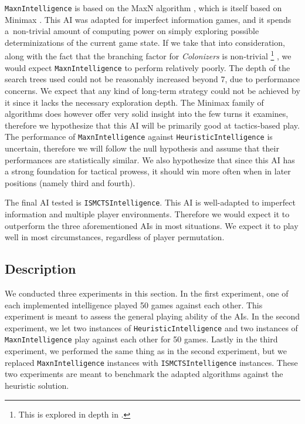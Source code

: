 \texttt{MaxnIntelligence} is based on the MaxN algorithm \cite{Luckhardt86}, which
is itself based on Minimax \cite{Millington09}. This AI was adapted for imperfect
information games, and it spends a~non-trivial amount of computing power
on simply exploring possible determinizations of the current game state.
If we take that into consideration, along with the fact that the branching factor
for \emph{Colonizers} is non-trivial
\footnote{This is explored in depth in .}
, we would expect \texttt{MaxnIntelligence}
to perform relatively poorly. The depth of the search trees used could not be
reasonably increased beyond 7, due to performance concerns. We expect that any kind of
long-term strategy could not be achieved by it since it lacks the necessary
exploration depth. The Minimax family of algorithms does however offer very
solid insight into the few turns it examines, therefore we hypothesize that this AI will be
primarily good at tactics-based play. The performance of \texttt{MaxnIntelligence}
against \texttt{HeuristicIntelligence} is uncertain, therefore we will follow the null
hypothesis and assume that their performances are statistically similar.
We also hypothesize that since this AI has a strong foundation for tactical prowess,
it should win more often when in later positions (namely third and fourth).

The final AI tested is \texttt{ISMCTSIntelligence}. This AI is well-adapted to
imperfect information and multiple player environments. Therefore we would expect
it to outperform the three aforementioned AIs in most situations. We expect it
to play well in most circumstances, regardless of player permutation.

\subsection{Description}

We conducted three experiments in this section. In the first experiment, one of each
implemented intelligence played 50 games against each other. This experiment is meant
to assess the general playing ability of the AIs. In the second experiment, we
let two instances of \texttt{HeuristicIntelligence} and two instances of
\texttt{MaxnIntelligence} play against each other for 50 games.
Lastly in the third experiment, we performed the same thing as in the second experiment,
but we replaced \texttt{MaxnIntelligence} instances with \texttt{ISMCTSIntelligence}
instances. These two experiments are meant to benchmark the adapted algorithms
against the heuristic solution.

